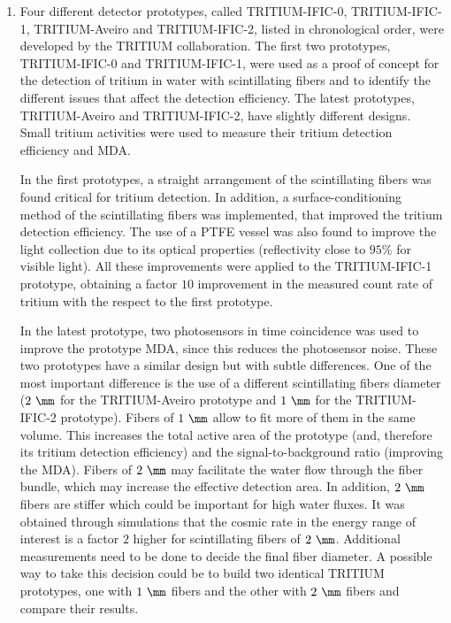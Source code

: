\begin{enumerate}
\item{} Four different detector prototypes, called TRITIUM-IFIC-0, TRITIUM-IFIC-1, TRITIUM-Aveiro and TRITIUM-IFIC-2, listed in chronological order, were developed by the TRITIUM collaboration. The first two prototypes, TRITIUM-IFIC-0 and TRITIUM-IFIC-1, were used as a proof of concept for the detection of tritium in water with scintillating fibers and to identify the different issues that affect the detection efficiency. The latest prototypes, TRITIUM-Aveiro and TRITIUM-IFIC-2, have slightly different designs. Small tritium activities were used to measure their tritium detection efficiency and MDA. %

In the first prototypes, a straight arrangement of the scintillating fibers was found critical for tritium detection. In addition, a surface-conditioning method of the scintillating fibers was implemented, that improved the tritium detection efficiency. The use of a PTFE vessel was also found to improve the light collection due to its optical properties (reflectivity close to $95\%$ for visible light). All these improvements were applied to the TRITIUM-IFIC-1 prototype, obtaining a factor $10$ improvement in the measured count rate of tritium with the respect to the first prototype. %

In the latest prototype, two photosensors in time coincidence was used to improve the prototype MDA, since this reduces the photosensor noise. These two prototypes have a similar design but with subtle differences. One of the most important difference is the use of a different scintillating fibers diameter ($2~\mm$ for the TRITIUM-Aveiro prototype and $1~\mm$ for the TRITIUM-IFIC-2 prototype). Fibers of $1~\mm$ allow to fit more of them in the same volume. This increases the total active area of the prototype (and, therefore its tritium detection efficiency) and the signal-to-background ratio (improving the MDA). Fibers of $2~\mm$ may facilitate the water flow through the fiber bundle, which may increase the effective detection area. In addition, $2~\mm$ fibers are stiffer which could be important for high water fluxes. It was obtained through simulations that the cosmic rate in the energy range of interest is a factor $2$ higher for scintillating fibers of $2~\mm$. Additional measurements need to be done to decide the final fiber diameter. A possible way to take this decision could be to build two identical TRITIUM prototypes, one with $1~\mm$ fibers and the other with $2~\mm$ fibers and compare their results. 


\end{enumerate}
